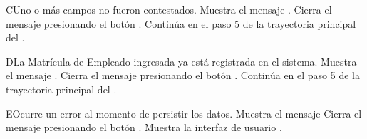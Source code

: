 \begin{UCtrayectoriaA}{C}{Uno o más campos no fueron contestados.}
    \UCpaso Muestra el mensaje .
    \UCpaso[\UCactor] Cierra el mensaje presionando el botón .
    \UCpaso Continúa en el paso 5 de la trayectoria principal del .
\end{UCtrayectoriaA}
\begin{UCtrayectoriaA}{D}{La Matrícula de Empleado ingresada ya está registrada en el sistema.}
    \UCpaso Muestra el mensaje .
    \UCpaso[\UCactor] Cierra el mensaje presionando el botón .
    \UCpaso Continúa en el paso 5 de la trayectoria principal del .
\end{UCtrayectoriaA}
\begin{UCtrayectoriaA}{E}{Ocurre un error al momento de persistir los datos.}
    \UCpaso Muestra el mensaje 
    \UCpaso[\UCactor] Cierra el mensaje presionando el botón .
    \UCpaso Muestra la interfaz de usuario .
\end{UCtrayectoriaA}